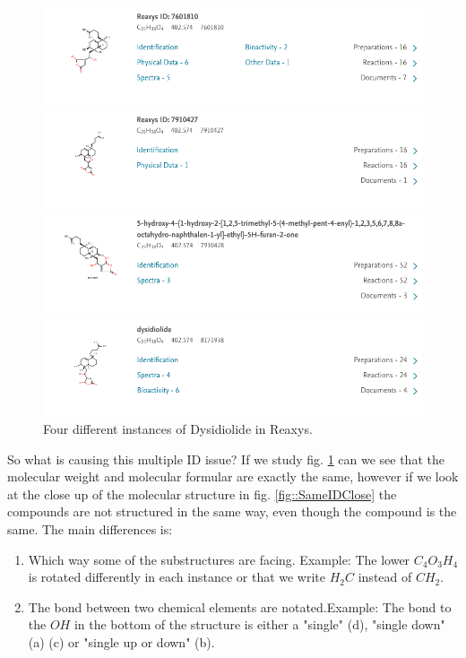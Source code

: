 \documentclass[a4paper,10pt,titlepage]{paper}
\begin{document}
\begin{figure}[H]
\hspace{-1cm}
\includegraphics[scale=0.5]{Billeder/Dysidiolide-7601810.png}

\hspace{-1cm}
\includegraphics[scale=0.5]{Billeder/Dysidiolide-7910427.png}

\hspace{-1cm}
\includegraphics[scale=0.5]{Billeder/Dysidiolide-7910428.png}

\hspace{-1cm}
\includegraphics[scale=0.5]{Billeder/Dysidiolide-8171938.png}
\caption{Four different instances of Dysidiolide in Reaxys.}
\label{fig::SameID}
\end{figure}

So what is causing this multiple ID issue? If we study fig. \ref{fig::SameID} can we see that the molecular weight and molecular formular are exactly the same, however if we look at the close up of the molecular structure in fig. \ref{fig::SameIDClose} the compounds are not structured in the same way, even though the compound is the same. The main differences is:
\begin{enumerate}
\item
Which way some of the substructures are facing. Example: The lower $C_4O_3H_4$ is rotated differently in each instance or that we write $H_2C$ instead of $CH_2$.
\item
The bond between two chemical elements are notated.Example: The bond to the $OH$ in the bottom of the structure is either a "single" (d), "single down" (a) (c) or "single up or down" (b).
\end{enumerate}
\end{document}
